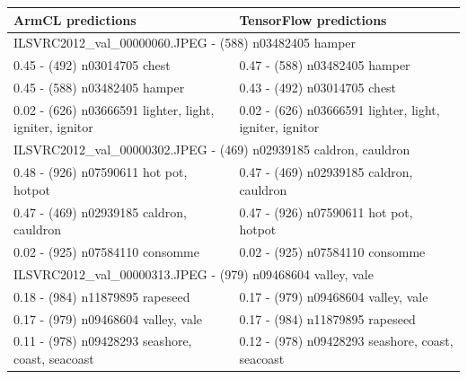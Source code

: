 \documentclass[sigplan]{acmart}
\begin{document}
\begin{table}[htb]
  \centering
  \begin{tabular}{l|l}
  \toprule
  {\bf ArmCL predictions} & {\bf TensorFlow predictions} \\
  \midrule
  \midrule
  \multicolumn{2}{l}{ILSVRC2012\_val\_00000060.JPEG - (588) n03482405 hamper} \\
  \midrule
  0.45 - (492) n03014705 chest                              &  0.47 - (588) n03482405 hamper                              \\
  0.45 - (588) n03482405 hamper                             &  0.43 - (492) n03014705 chest                               \\ 
  0.02 - (626) n03666591 lighter, light, igniter, ignitor   &  0.02 - (626) n03666591 lighter, light, igniter, ignitor    \\
  \midrule
  \multicolumn{2}{l}{ILSVRC2012\_val\_00000302.JPEG - (469) n02939185 caldron, cauldron} \\
  \midrule
  0.48 - (926) n07590611 hot pot, hotpot                    &  0.47 - (469) n02939185 caldron, cauldron                   \\
  0.47 - (469) n02939185 caldron, cauldron                  &  0.47 - (926) n07590611 hot pot, hotpot                     \\
  0.02 - (925) n07584110 consomme                           &  0.02 - (925) n07584110 consomme                            \\
  \midrule
  \multicolumn{2}{l}{ILSVRC2012\_val\_00000313.JPEG - (979) n09468604 valley, vale} \\
  \midrule
  0.18 - (984) n11879895 rapeseed                           &  0.17 - (979) n09468604 valley, vale                        \\
  0.17 - (979) n09468604 valley, vale                       &  0.17 - (984) n11879895 rapeseed                            \\
  0.11 - (978) n09428293 seashore, coast, seacoast          &  0.12 - (978) n09428293 seashore, coast, seacoast           \\
  \bottomrule
  \end{tabular}


\end{table}
\end{document}
